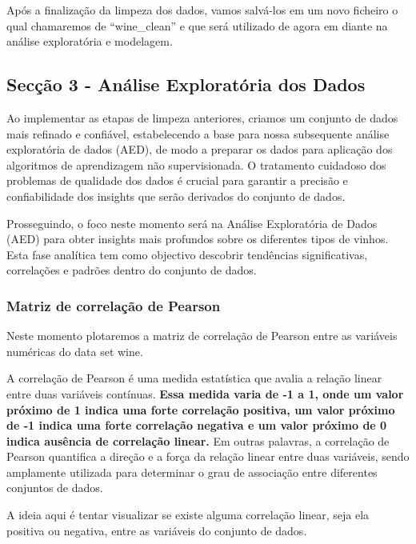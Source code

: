 \documentclass[
  letterpaper,
  DIV=11,
  numbers=noendperiod]{scrartcl}
\begin{document}
Após a finalização da limpeza dos dados, vamos salvá-los em um novo
ficheiro o qual chamaremos de ``wine\_clean'' e que será utilizado de
agora em diante na análise exploratória e modelagem.

\subsection{Secção 3 - Análise Exploratória dos
Dados}\label{secuxe7uxe3o-3---anuxe1lise-exploratuxf3ria-dos-dados}

Ao implementar as etapas de limpeza anteriores, criamos um conjunto de
dados mais refinado e confiável, estabelecendo a base para nossa
subsequente análise exploratória de dados (AED), de modo a preparar os
dados para aplicação dos algoritmos de aprendizagem não supervisionada.
O tratamento cuidadoso dos problemas de qualidade dos dados é crucial
para garantir a precisão e confiabilidade dos insights que serão
derivados do conjunto de dados.

Prosseguindo, o foco neste momento será na Análise Exploratória de Dados
(AED) para obter insights mais profundos sobre os diferentes tipos de
vinhos. Esta fase analítica tem como objectivo descobrir tendências
significativas, correlações e padrões dentro do conjunto de dados.

\subsubsection{Matriz de correlação de
Pearson}\label{matriz-de-correlauxe7uxe3o-de-pearson}

Neste momento plotaremos a matriz de correlação de Pearson entre as
variáveis numéricas do data set wine.

A correlação de Pearson é uma medida estatística que avalia a relação
linear entre duas variáveis contínuas. \textbf{Essa medida varia de -1 a
1, onde um valor próximo de 1 indica uma forte correlação positiva, um
valor próximo de -1 indica uma forte correlação negativa e um valor
próximo de 0 indica ausência de correlação linear.} Em outras palavras,
a correlação de Pearson quantifica a direção e a força da relação linear
entre duas variáveis, sendo amplamente utilizada para determinar o grau
de associação entre diferentes conjuntos de dados.

\newpage{}

A ideia aqui é tentar visualizar se existe alguma correlação linear,
seja ela positiva ou negativa, entre as variáveis do conjunto de dados.
\end{document}
